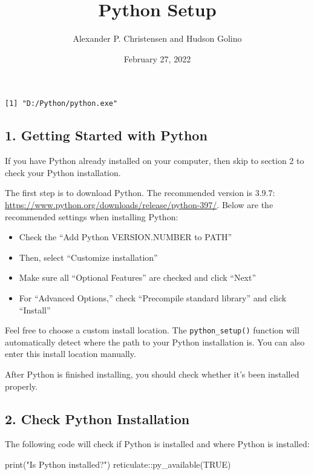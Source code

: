 \documentclass[
]{article}
\title{Python Setup}
\author{Alexander P. Christensen and Hudson Golino}
\date{February 27, 2022}
\newenvironment{Shaded}{\begin{snugshade}}{\end{snugshade}}
\newcommand{\ConstantTok}[1]{\textcolor[rgb]{0.00,0.00,0.00}{#1}}
\newcommand{\FunctionTok}[1]{\textcolor[rgb]{0.00,0.00,0.00}{#1}}
\newcommand{\NormalTok}[1]{#1}
\newcommand{\SpecialCharTok}[1]{\textcolor[rgb]{0.00,0.00,0.00}{#1}}
\newcommand{\StringTok}[1]{\textcolor[rgb]{0.31,0.60,0.02}{#1}}
\begin{document}
\maketitle

\begin{verbatim}
[1] "D:/Python/python.exe"
\end{verbatim}

\hypertarget{getting-started-with-python}{%
\subsection{1. Getting Started with
Python}\label{getting-started-with-python}}

If you have Python already installed on your computer, then skip to
section 2 to check your Python installation.

The first step is to download Python. The recommended version is 3.9.7:
\url{https://www.python.org/downloads/release/python-397/}. Below are
the recommended settings when installing Python:

\begin{itemize}
\item
  Check the ``Add Python VERSION.NUMBER to PATH''
\item
  Then, select ``Customize installation''
\item
  Make sure all ``Optional Features'' are checked and click ``Next''
\item
  For ``Advanced Options,'' check ``Precompile standard library'' and
  click ``Install''
\end{itemize}

Feel free to choose a custom install location. The
\texttt{python\_setup()} function will automatically detect where the
path to your Python installation is. You can also enter this install
location manually.

After Python is finished installing, you should check whether it's been
installed properly.

\hypertarget{check-python-installation}{%
\subsection{2. Check Python
Installation}\label{check-python-installation}}

The following code will check if Python is installed and where Python is
installed:

\begin{Shaded}
\begin{Highlighting}[]
\FunctionTok{print}\NormalTok{(}\StringTok{"Is Python installed?"}\NormalTok{)}
\NormalTok{reticulate}\SpecialCharTok{::}\FunctionTok{py\_available}\NormalTok{(}\ConstantTok{TRUE}\NormalTok{)}
\end{Highlighting}
\end{Shaded}
\end{document}
